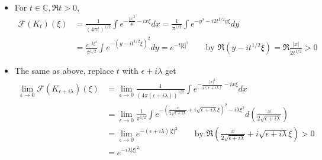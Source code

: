 \documentclass[a4paper]{book}
\makeatletter
\newenvironment{sol}[1][\solname]{\par
  \pushQED{\qed}
  \normalfont \topsep6\p@\@plus6\p@\relax
  \trivlist
  \item[\hskip\labelsep
        \itshape
    #1\@addpunct{.}]\ignorespaces
}{\popQED\endtrivlist\@endpefalse}
\providecommand{\solname}{Solution}
\numberwithin{equation}{chapter}
\theoremstyle{definition}
\makeatother
\begin{document}
\begin{sol}
    \begin{itemize}
        \item For $ t \in \mathbb{C}, \mathfrak{R} t > 0$,
        \begin{align*}
            \mathcal{F}(K_t)(\xi) &= \frac{1}{(4\pi t)^{1/2}} \int e^{-\frac{|x|^2}{4t} - ix\xi} dx 
            = \frac{1}{\pi^{1/2}} \int e^{-y^2 - i2 t^{1/2}y \xi} dy \\
            &= \frac{e^{-t \xi^2}}{\pi^{1/2}} \int e^{-(y - it^{1/2}\xi)^2}dy
            = e^{-t |\xi|^2} \qquad  \text{by }\mathfrak{R}(y-it^{1/2}\xi) = \mathfrak{R}\frac{|x|}{2t^{1/2}} > 0
        \end{align*}

        \item The same as above, replace $t$ with $\epsilon + i \lambda$ get 
        \begin{align*}
            \lim_{\epsilon \rightarrow 0}\mathcal{F}(K_{\epsilon + i\lambda})(\xi) 
            &= \lim_{\epsilon \rightarrow 0} \frac{1}{(4\pi (\epsilon +i\lambda))^{1/2}} \int e^{-\frac{|x|^2}{4(\epsilon +i\lambda)} - ix\xi} dx \\
            &= \lim_{\epsilon \rightarrow 0} \frac{1}{\pi^{1/2}} \int e^{-(\frac{x}{2\sqrt{\epsilon + i\lambda}} + i\sqrt{\epsilon + i\lambda}\xi)^2 -i\lambda\xi^2} d(\frac{x}{2\sqrt{\epsilon + i\lambda}}) \\
            &= \lim_{\epsilon \rightarrow 0}e^{-(\epsilon + i\lambda)|\xi|^2} \qquad \text{by } \mathfrak{R}(\frac{x}{2\sqrt{\epsilon + i\lambda}} + i\sqrt{\epsilon + i\lambda}\xi) > 0 \\
            &= e^{-i\lambda|\xi|^2}
        \end{align*}
    \end{itemize}
\end{sol}
\end{document}
